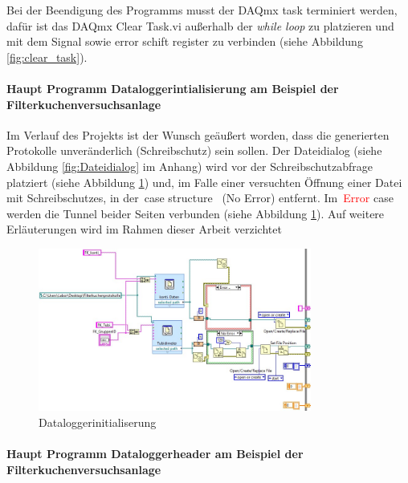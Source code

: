 Bei der Beendigung des Programms musst der DAQmx task terminiert werden, dafür ist das {\Menlo DAQmx Clear Task.vi} außerhalb der \textit{while loop} zu platzieren und mit dem Signal sowie error {\Menlo schift \mbox{register}} zu verbinden  (siehe Abbildung \ref{fig:clear_task}).


\paragraph{Haupt Programm Dataloggerintialisierung am Beispiel der Filterkuchenversuchsanlage} 
Im Verlauf des Projekts ist der Wunsch geäußert worden, dass die generierten Protokolle unveränderlich (Schreibschutz) sein sollen. Der Dateidialog (siehe Abbildung \ref{fig:Dateidialog} im Anhang) wird vor der Schreibschutzabfrage platziert (siehe Abbildung \ref{fig:schreibschutz_dialog}) und, im Falle einer versuchten Öffnung einer Datei mit Schreibschutzes, in der \,{\Menlo case structure} \, (\textcolor{OliveGreen}{{\Menlo No Error}}) entfernt. Im \,\textcolor{red}{{\Menlo Error}} {\Menlo case} werden die Tunnel beider Seiten verbunden (siehe Abbildung \ref{fig:schreibschutz_dialog}). Auf weitere Erläuterungen wird im Rahmen dieser Arbeit verzichtet
\label{sec:Pfad}

\begin{figure}[h!] %
\centering
\includegraphics[width=0.8\textwidth]{Bilder/LabVIEW_serialport/Haupt_VI_unten_links_3.jpg}
\vspace{0em}
 \caption[Dataloggerinitialiserung]
{Dataloggerinitialiserung}\label{fig:schreibschutz_dialog}
\end{figure}


\paragraph{Haupt Programm Dataloggerheader am Beispiel der Filterkuchenversuchsanlage} 

